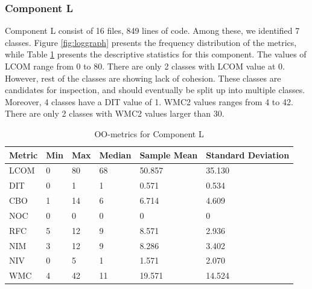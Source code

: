 \subsubsection{Component L}
Component L consist of 16 files, 849 lines of code. Among these, we identified 7 classes. Figure \ref{fig:loggraph} presents the frequency distribution of the metrics, while Table \ref{tab:oometrics-log} presents the descriptive statistics for this component. The values of LCOM range from 0 to 80. There are only 2 classes with LCOM value at 0. However, rest of the classes are showing lack of cohesion. These classes are candidates for inspection, and should eventually be split up into multiple classes. Moreover, 4 classes have a DIT value of 1. WMC2 values ranges from 4 to 42. There are only 2 classes with WMC2 values larger than 30.

\begin{table}[]
\centering
\caption{OO-metrics for Component L}
\label{tab:oometrics-log}
\begin{tabular}{|l|l|l|l|l|l|}
\hline
\textbf{Metric} & \textbf{Min} & \textbf{Max} & \textbf{Median} & \textbf{Sample Mean} & \textbf{Standard Deviation} \\ \hline
LCOM            & 0            & 80           & 68              & 50.857               & 35.130                      \\ \hline
DIT             & 0            & 1            & 1               & 0.571                & 0.534                       \\ \hline
CBO             & 1            & 14           & 6               & 6.714                & 4.609                       \\ \hline
NOC             & 0            & 0            & 0               & 0                    & 0                           \\ \hline
RFC             & 5            & 12           & 9               & 8.571                & 2.936                       \\ \hline
NIM             & 3            & 12           & 9               & 8.286                & 3.402                       \\ \hline
NIV             & 0            & 5            & 1               & 1.571                & 2.070                       \\ \hline
WMC            & 4            & 42          & 11              & 19.571                 & 14.524                      \\ \hline
\end{tabular}
\end{table}



